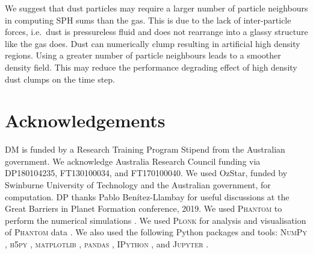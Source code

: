 \documentclass[fleqn,usenatbib]{mnras}
\begin{document}
We suggest that dust particles may require a larger number of particle
neighbours in computing SPH sums than the gas. This is due to the lack of
inter-particle forces, i.e.\ dust is pressureless fluid and does not rearrange
into a glassy structure like the gas does. Dust can numerically clump resulting
in artificial high density regions. Using a greater number of particle
neighbours leads to a smoother density field. This may reduce the performance
degrading effect of high density dust clumps on the time step.


\section*{Acknowledgements}

DM is funded by a Research Training Program Stipend from the Australian
government. We acknowledge Australia Research Council funding via DP180104235,
FT130100034, and FT170100040. We used OzStar, funded by Swinburne University of
Technology and the Australian government, for computation. DP thanks Pablo
Benítez-Llambay for useful discussions at the Great Barriers in Planet Formation
conference, 2019. We used \textsc{Phantom} to perform the numerical simulations
\citep{Price2018PASA...35...31P}. We used \textsc{Plonk} for analysis and
visualisation of \textsc{Phantom} data \citep{Mentiplay2019JOSS....4.1884M}. We
also used the following Python packages and tools: \textsc{NumPy}
\citep{Oliphant2006, van-der-Walt2011CSE....13b..22V}, \textsc{h5py}
\citep{Collette2013}, \textsc{matplotlib} \citep{Hunter2007CSE.....9...90H},
\textsc{pandas} \citep{McKinney2010}, \textsc{IPython}
\citep{Perez2007CSE.....9c..21P}, and \textsc{Jupyter} \citep{Kluyver2016}.















\bsp %
\label{lastpage}
\end{document}
